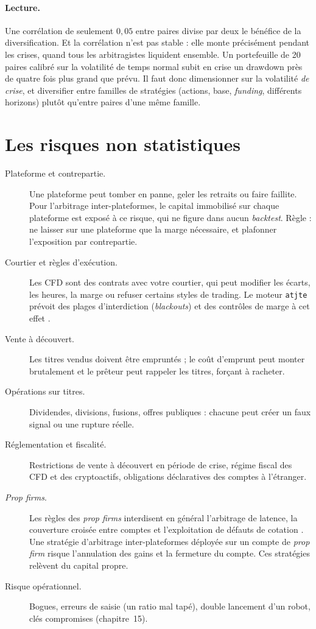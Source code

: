 \paragraph{Lecture.} Une corrélation de seulement $0{,}05$ entre paires divise par deux le bénéfice de la diversification. Et la corrélation n'est pas stable : elle monte précisément pendant les crises, quand tous les arbitragistes liquident ensemble. Un portefeuille de 20 paires calibré sur la volatilité de temps normal subit en crise un drawdown près de quatre fois plus grand que prévu. Il faut donc dimensionner sur la volatilité \emph{de crise}, et diversifier entre familles de stratégies (actions, base, \emph{funding}, différents horizons) plutôt qu'entre paires d'une même famille.

\section{Les risques non statistiques}

\begin{description}
\item[Plateforme et contrepartie.] Une plateforme peut tomber en panne, geler les retraits ou faire faillite. Pour l'arbitrage inter-plateformes, le capital immobilisé sur chaque plateforme est exposé à ce risque, qui ne figure dans aucun \emph{backtest}. Règle : ne laisser sur une plateforme que la marge nécessaire, et plafonner l'exposition par contrepartie.
\item[Courtier et règles d'exécution.] Les CFD sont des contrats avec votre courtier, qui peut modifier les écarts, les heures, la marge ou refuser certains styles de trading. Le moteur \texttt{atjte} prévoit des plages d'interdiction (\emph{blackouts}) et des contrôles de marge à cet effet \citep{atjte}.
\item[Vente à découvert.] Les titres vendus doivent être empruntés ; le coût d'emprunt peut monter brutalement et le prêteur peut rappeler les titres, forçant à racheter.
\item[Opérations sur titres.] Dividendes, divisions, fusions, offres publiques : chacune peut créer un faux signal ou une rupture réelle.
\item[Réglementation et fiscalité.] Restrictions de vente à découvert en période de crise, régime fiscal des CFD et des cryptoactifs, obligations déclaratives des comptes à l'étranger.
\item[\emph{Prop firms}.] Les règles des \emph{prop firms} interdisent en général l'arbitrage de latence, la couverture croisée entre comptes et l'exploitation de défauts de cotation \citep{nexusfi}. Une stratégie d'arbitrage inter-plateformes déployée sur un compte de \emph{prop firm} risque l'annulation des gains et la fermeture du compte. Ces stratégies relèvent du capital propre.
\item[Risque opérationnel.] Bogues, erreurs de saisie (un ratio mal tapé), double lancement d'un robot, clés compromises (chapitre~15).
\end{description}

